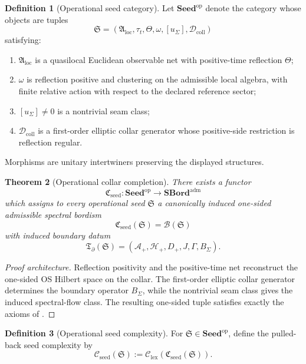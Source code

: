 \documentclass[11pt,a4paper]{article}
\newtheorem{theorem}{Theorem}[section]
\theoremstyle{definition}
\newtheorem{definition}[theorem]{Definition}
\theoremstyle{remark}
\newcommand{\Seedop}{\mathbf{Seed}^{\mathrm{op}}}
\newcommand{\Cseed}{\mathfrak C_{\mathrm{seed}}}
\begin{document}
\begin{definition}[Operational seed category]
\label{def:operational-seed-category}
Let $\Seedop$ denote the category whose objects are tuples
\[
\mathfrak S=(\mathfrak A_{\mathrm{loc}},\tau_t,\Theta,\omega,[u_\Sigma],\mathcal D_{\mathrm{coll}})
\]
satisfying:
\begin{enumerate}[label=(\roman*), leftmargin=1.5em, topsep=3pt, itemsep=2pt]
    \item $\mathfrak A_{\mathrm{loc}}$ is a quasilocal Euclidean observable net with positive-time
    reflection $\Theta$;
    \item $\omega$ is reflection positive and clustering on the admissible local algebra, with finite
    relative action with respect to the declared reference sector;
    \item $[u_\Sigma]\neq 0$ is a nontrivial seam class;
    \item $\mathcal D_{\mathrm{coll}}$ is a first-order elliptic collar generator whose positive-side
    restriction is reflection regular.
\end{enumerate}
Morphisms are unitary intertwiners preserving the displayed structures.
\end{definition}

\begin{theorem}[Operational collar completion]
\label{thm:operational-collar-completion}
There exists a functor
\[
\Cseed:\Seedop\longrightarrow \mathbf{SBord}^{\mathrm{adm}}
\]
which assigns to every operational seed $\mathfrak S$ a canonically induced one-sided admissible
spectral bordism
\[
\Cseed(\mathfrak S)=\mathcal B(\mathfrak S)
\]
with induced boundary datum
\[
\mathfrak T_{\partial}(\mathfrak S)=(\mathcal A_+,\mathcal H_+,D_+,J,\Gamma,B_\Sigma).
\]
\end{theorem}

\begin{proof}[Proof architecture]
Reflection positivity and the positive-time net reconstruct the one-sided OS Hilbert space on the
collar. The first-order elliptic collar generator determines the boundary operator $B_\Sigma$,
while the nontrivial seam class gives the induced spectral-flow class. The resulting one-sided
tuple satisfies exactly the axioms of .
\end{proof}

\begin{definition}[Operational seed complexity]
\label{def:operational-seed-complexity}
For $\mathfrak S\in\Seedop$, define the pulled-back seed complexity by
\[
\mathcal C_{\mathrm{seed}}(\mathfrak S):=\mathcal C_{\mathrm{lex}}(\Cseed(\mathfrak S)).
\]
\end{definition}
\end{document}
